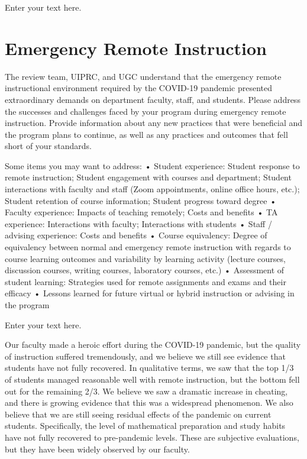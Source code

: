 \documentclass[12pt]{article}
\begin{document}
Enter your text here.


\section{Emergency Remote Instruction}
The review team, UIPRC, and UGC understand that the emergency remote instructional environment required by the COVID-19 pandemic presented extraordinary demands on department faculty, staff, and students. Please address the successes and challenges faced by your program during emergency remote instruction. Provide information about any new practices that were beneficial and the program plans to continue, as well as any practices and outcomes that fell short of your standards.

Some items you may want to address:
    • Student experience: Student response to remote instruction; Student engagement with courses and department; Student interactions with faculty and staff (Zoom appointments, online office hours, etc.); Student retention of course information; Student progress toward degree
    • Faculty experience: Impacts of teaching remotely; Costs and benefits
    • TA experience: Interactions with faculty; Interactions with students
    • Staff / advising experience: Costs and benefits
    • Course equivalency: Degree of equivalency between normal and emergency remote instruction with regards to course learning outcomes and variability by learning activity (lecture courses, discussion courses, writing courses, laboratory courses, etc.)
    • Assessment of student learning: Strategies used for remote assignments and exams and their efficacy
    • Lessons learned for future virtual or hybrid instruction or advising in the program

Enter your text here.

Our faculty made a heroic effort during the COVID-19 pandemic, but the quality of instruction suffered tremendously, and we believe we still see evidence that students have not fully recovered.  In qualitative terms, we saw that the top 1/3 of students managed reasonable well with remote instruction, but the bottom fell out for the remaining 2/3.  We believe we saw a dramatic increase in cheating, and there is growing evidence that this was a widespread phenomenon.  We also believe that we are still seeing residual effects of the pandemic on current students.  Specifically, the level of mathematical preparation and study habits have not fully recovered to pre-pandemic levels.  These are subjective evaluations, but they have been widely observed by our faculty.
\end{document}
